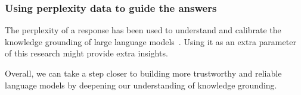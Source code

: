 \subsubsection{Using perplexity data to guide the answers}
The perplexity of a response has been used to understand and calibrate the knowledge grounding of large language models~\cite{how_can_we_know}.
Using it as an extra parameter of this research might provide extra insights.

Overall, we can take a step closer to building more trustworthy and reliable language models by deepening our understanding of knowledge grounding.
